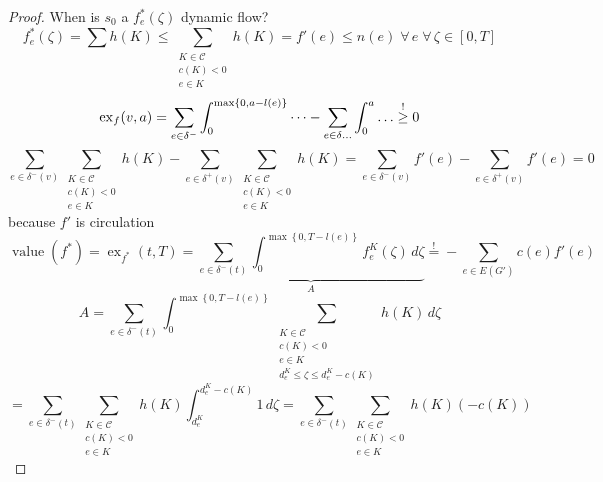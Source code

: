 \documentclass{article}
\newcommand{\set}[1]{\left\{#1\right\}}
\newcommand{\fall}{\;\forall\,}
\begin{document}
\begin{proof}
  When is $s_0$ a $f_e^*(\zeta)$ dynamic flow?
  \begin{equation}
    f_e^*(\zeta) = \sum h(K) \leq \sum_{\substack{K \in \mathcal{C} \\ c(K) < 0 \\ e \in K}} h(K) = f'(e) \leq n(e) \fall e \fall \zeta \in [0, T]
  \end{equation} \begin{equation}
    \operatorname{ex}_f(v, a) = \sum_{e \in \delta^-} \int_0^{\max\set{0, a-l(e)}} \dots
      - \sum_{e \in \delta\dots} \int_0^a \dots \stackrel{!}{\geq} 0 \\
  \end{equation} \begin{equation*}
    \sum_{e \in \delta^-(v)} \sum_{\substack{K \in \mathcal{C} \\ c(K) < 0 \\ e \in K}} h(K)
      - \sum_{e \in \delta^+(v)} \sum_{\substack{K \in \mathcal{C} \\ c(K) < 0 \\ e \in K}} h(K)
      = \sum_{e \in \delta^-(v)} f'(e) - \sum_{e \in \delta^+(v)} f'(e) = 0
  \end{equation*}
  because $f'$ is circulation
  \begin{equation*}
    \operatorname{value}(f^*)
      = \operatorname{ex}_{f^*}(t, T)
      = \underbrace{\sum_{e \in \delta^-(t)} \int_0^{\max\set{0, T - l(e)}} f_e^K(\zeta) \,d\zeta}_{A}
      \stackrel{!}{=} -\sum_{e \in E(G')} c(e) f'(e)
  \end{equation*}
  \begin{equation*}
    A = \sum_{e \in \delta^-(t)} \int_0^{\max\set{0, T - l(e)}}
      \sum_{\substack{K \in \mathcal{C} \\ c(K) < 0 \\ e \in K \\ d_e^K \leq \zeta \leq d_e^K - c(K)}}
      h(K) \,  d\zeta
  \end{equation*} \begin{equation*}
      = \sum_{e \in \delta^-(t)} \sum_{\substack{K \in \mathcal{C} \\ c(K) < 0 \\ e \in K}} h(K) \int_{d_e^K}^{d_e^K -c(K)} 1 \,d\zeta
      = \sum_{e \in \delta^-(t)} \sum_{\substack{K \in \mathcal{C} \\ c(K) < 0 \\ e \in K}} h(K) (-c(K))
  \end{equation*} \begin{equation*}

\end{equation*}
\end{proof}
\end{document}
